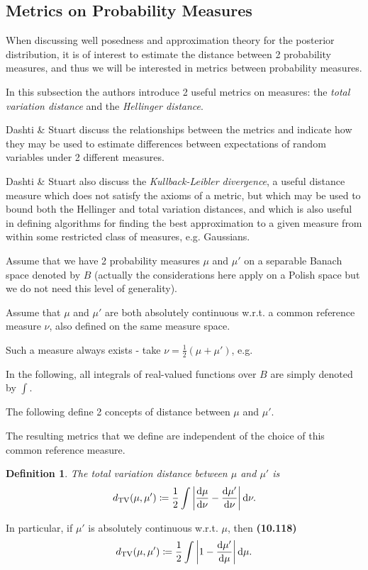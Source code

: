\documentclass[oneside,11pt]{book}
\numberwithin{equation}{section}
\newtheorem{definition}{Definition}[section]
\begin{document}
\subsection{Metrics on Probability Measures}
When discussing well posedness and approximation theory for the posterior distribution, it is of interest to estimate the distance between 2 probability measures, and thus we will be interested in metrics between probability measures.

In this subsection the authors introduce 2 useful metrics on measures: the \textit{total variation distance} and the \textit{Hellinger distance}.

Dashti \& Stuart discuss the relationships between the metrics and indicate how they may be used to estimate differences between expectations of random variables under 2 different measures.

Dashti \& Stuart also discuss the \textit{Kullback-Leibler divergence}, a useful distance measure which does not satisfy the axioms of a metric, but which may be used to bound both the Hellinger and total variation distances, and which is also useful in defining algorithms for finding the best approximation to a given measure from within some restricted class of measures, e.g. Gaussians.

%
Assume that we have 2 probability measures $\mu$ and $\mu'$ on a separable Banach space denoted by $B$ (actually the considerations here apply on a Polish space but we do not need this level of generality).

Assume that $\mu$ and $\mu'$ are both absolutely continuous w.r.t. a common reference measure $\nu$, also defined on the same measure space.

Such a measure always exists - take $\nu = \frac{1}{2}(\mu + \mu')$, e.g.

In the following, all integrals of real-valued functions over $B$ are simply denoted by $\int$.

The following define 2 concepts of distance between $\mu$ and $\mu'$.

The resulting metrics that we define are independent of the choice of this common reference measure.

\begin{definition}
    The \emph{total variation distance} between $\mu$ and $\mu'$ is
    \begin{align*}
        d_{\rm TV}(\mu,\mu')\coloneqq\frac{1}{2}\int \left|\frac{{\rm d}\mu}{{\rm d}\nu} - \frac{{\rm d}\mu'}{{\rm d}\nu}\right|{\rm d}\nu.
    \end{align*}
\end{definition}
In particular, if $\mu'$ is absolutely continuous w.r.t. $\mu$, then \textbf{(10.118)}
\begin{align*}
    d_{\rm TV}(\mu,\mu')\coloneqq\frac{1}{2}\int \left|1 - \frac{{\rm d}\mu'}{{\rm d}\mu}\right|{\rm d}\mu.
\end{align*}
\end{document}
